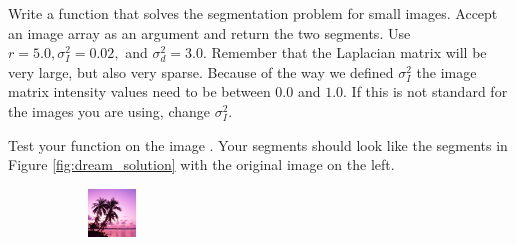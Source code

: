 \begin{problem}  Write a function  that solves the segmentation problem for small images.
Accept an image array as an argument and return the two segments.
Use $r = 5.0, \sigma_I^2 = 0.02,$ and $\sigma_d^2 = 3.0$.
Remember that the Laplacian matrix will be very large, but also very sparse.
Because of the way we defined $\sigma_I^2$ the image matrix intensity values need to be between $0.0$ and $1.0$. If this is not standard for the images you are using, change $\sigma_I^2$.

Test your function on the image . Your segments should look like the segments in Figure \ref{fig:dream_solution} with the original image on the left.
\end{problem}

\begin{figure}
\centering
    \centering
    \begin{subfigure}{0.31\textwidth}
        \includegraphics[width=\textwidth]{RegDream.png}
    \end{subfigure}
    \hspace*{\fill}
    \begin{subfigure}{0.31\textwidth}

\end{subfigure}
\end{figure}
